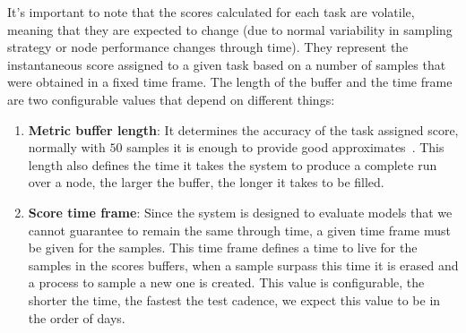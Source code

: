 It's important to note that the scores calculated for each task are volatile, meaning that they are expected to change (due to normal variability in sampling strategy or node performance changes through time). They represent the instantaneous score assigned to a given task based on a number of samples that were obtained in a fixed time frame. The length of the buffer and the time frame are two configurable values that depend on different things:
\begin{enumerate}
    \item \textbf{Metric buffer length}: It determines the accuracy of the task assigned score, normally with $50$ samples it is enough to provide good approximates~\cite{polo2024tinybenchmarks}. This length also defines the time it takes the system to produce a complete run over a node, the larger the buffer, the longer it takes to be filled.
    \item \textbf{Score time frame}: Since the system is designed to evaluate models that we cannot guarantee to remain the same through time, a given time frame must be given for the samples. This time frame defines a time to live for the samples in the scores buffers, when a sample surpass this time it is erased and a process to sample a new one is created. This value is configurable, the shorter the time, the fastest the test cadence, we expect this value to be in the order of days.
\end{enumerate}